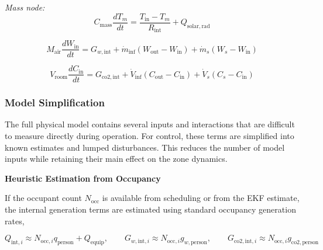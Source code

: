 \documentclass[12pt, a4paper]{article}
\begin{document}
	\noindent \textit{Mass node:}
	\begin{equation}
		C_{\mathrm{mass}} \frac{dT_m}{dt}
		=
		\frac{T_{\mathrm{in}} - T_m}{R_{\mathrm{int}}}
		+
		Q_{\mathrm{solar,rad}}
		\label{eq:mass_node_single}
	\end{equation}
	
	
	\begin{equation}
		M_{\mathrm{air}} \frac{dW_{\mathrm{in}}}{dt}
		=
		G_{w,\mathrm{int}}
		+
		\dot{m}_{\mathrm{inf}}
		(W_{\mathrm{out}} - W_{\mathrm{in}})
		+
		\dot{m}_{s}
		(W_s - W_{\mathrm{in}})
		\label{eq:humidity_single}
	\end{equation}
	
	\begin{equation}
		V_{\mathrm{room}} \frac{dC_{\mathrm{in}}}{dt}
		=
		G_{\mathrm{co2,int}}
		+
		\dot{V}_{\mathrm{inf}}
		(C_{\mathrm{out}} - C_{\mathrm{in}})
		+
		\dot{V}_{s}
		(C_s - C_{\mathrm{in}})
		\label{eq:co2_single}
	\end{equation}
	
	

	\subsubsection{Model Simplification}

	
	The full physical model contains several inputs and interactions that are difficult to measure directly during operation. For control, these terms are simplified into known estimates and lumped disturbances. This reduces the number of model inputs while retaining their main effect on the zone dynamics.
	
	\noindent\textbf{Heuristic Estimation from Occupancy}
	
	If the occupant count $N_{\mathrm{occ}}$ is available from scheduling or from the EKF estimate, the internal generation terms are estimated using standard occupancy generation rates,
	
	\begin{equation}
		Q_{\mathrm{int},i}
		\approx
		N_{\mathrm{occ},i} q_{\mathrm{person}}
		+
		Q_{\mathrm{equip}},
		\qquad
		G_{w,\mathrm{int},i}
		\approx
		N_{\mathrm{occ},i} g_{w,\mathrm{person}},
		\qquad
		G_{\mathrm{co2,int},i}
		\approx
		N_{\mathrm{occ},i} g_{\mathrm{co2,person}}
		\label{eq:heuristic_gen}
	\end{equation}
	
\end{document}
